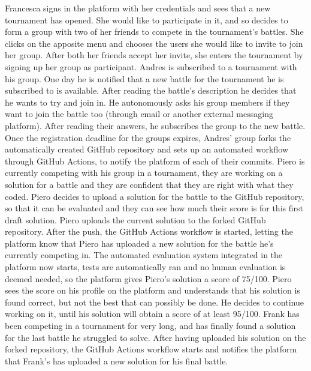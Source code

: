 \documentclass{article}
\newcounter{subsubsubsection}[subsubsection]
\begin{document}
{            
                Francesca signs in the platform with her credentials and sees that a new tournament has opened. She would like to participate in it, and so decides to form a group with two of her friends to compete in the tournament's battles. She clicks on the apposite menu and chooses the users she would like to invite to join her group.
                After both her friends accept her invite, she enters the tournament by signing up her group as participant. 
                Andres is subscribed to a tournament with his group. One day he is notified that a new battle for the tournament he is subscribed to is available.
                After reading the battle's description he decides that he wants to try and join in. He autonomously asks his group members if they want to join the battle too (through email or another external messaging platform).
                After reading their answers, he subscribes the group to the new battle.
                Once the registration deadline for the groups expires, Andres' group forks the automatically created GitHub repository and sets up an automated workflow through GitHub Actions, to notify the platform of each of their commits.
                Piero is currently competing with his group in a tournament, they are working on a solution for a battle and they are confident that they are right with what they coded. Piero decides to upload a solution for the battle to the GitHub repository, so that it can be evaluated and they can see how much their score is for this first draft solution.
                Piero uploads the current solution to the forked GitHub repository. After the push, the GitHub Actions workflow is started, letting the platform know that Piero has uploaded a new solution for the battle he's currently competing in.
                The automated evaluation system integrated in the platform now starts, tests are automatically ran and no human evaluation is deemed needed, so the platform gives Piero's solution a score of 75/100.
                Piero sees the score on his profile on the platform and understands that his solution is found correct, but not the best that can possibly be done. He decides to continue working on it, until his solution will obtain a score of at least 95/100.
                Frank has been competing in a tournament for very long, and has finally found a solution for the last battle he struggled to solve. After having uploaded his solution on the forked repository, the GitHub Actions workflow starts and notifies the platform that Frank's has uploaded a new solution for his final battle.
}
\end{document}
